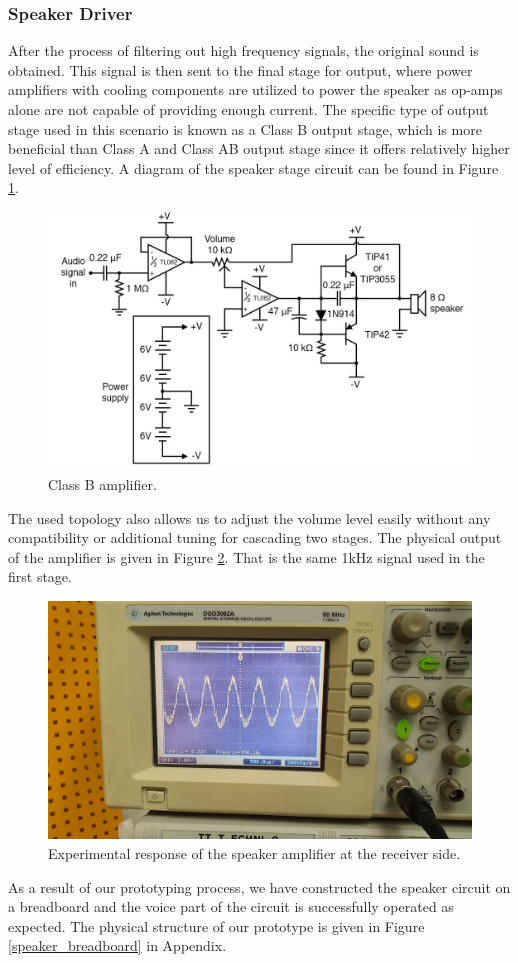 \documentclass[a4paper,10pt]{IEEEtran}
\begin{document}
\subsubsection{Speaker Driver}
After the process of filtering out high frequency signals, the original sound is obtained. This signal is then sent to the final stage for output, where power amplifiers with cooling components are utilized to power the speaker as op-amps alone are not capable of providing enough current. The specific type of output stage used in this scenario is known as a Class B output stage, which is more beneficial than Class A and Class AB output stage since it offers relatively higher level of efficiency. A diagram of the speaker stage circuit can be found in Figure \ref{classb}.
\begin{figure}[htbp!]
    \centering
    \includegraphics[width = 1\linewidth]{classb.png}
    \caption{Class B amplifier. }
    \label{classb}
\end{figure} 
The used topology also allows us to adjust the volume level easily without any compatibility or additional tuning for cascading two stages. The physical output of the amplifier is given in Figure \ref{speaker_osc}. That is the same 1kHz signal used in the first stage.
\begin{figure}[htbp!]
    \centering
    \includegraphics[width = 1\linewidth]{speaker_amplifier.jpeg}
    \caption{Experimental response of the speaker amplifier at the receiver side. }
    \label{speaker_osc}
\end{figure} 
As a result of our prototyping process, we have constructed the speaker circuit on a breadboard and the voice part of the circuit is successfully operated as expected. The physical structure of our prototype is given in Figure \ref{speaker_breadboard} in Appendix.
\end{document}
